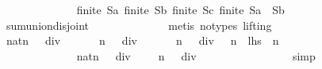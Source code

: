 \begin{isabellebody}
\ \ \ \ \ \ \ \ \ \ \ \ \isamarkupfalse%
\ {\isacharbackquoteopen}finite\ {\isacharquery}Sa{\isacharbackquoteclose}\ {\isacharbackquoteopen}finite\ {\isacharquery}Sb{\isacharbackquoteclose}\ {\isacharbackquoteopen}finite\ {\isacharquery}Sc{\isacharbackquoteclose}\ {\isacharbackquoteopen}finite\ {\isacharparenleft}{\isacharquery}Sa\ {\isasymunion}\ {\isacharquery}Sb{\isacharparenright}{\isacharbackquoteclose}\isanewline
\ \ \ \ \ \ \ \ \ \ \ \ \isamarkupfalse%
\ sum{\isachardot}union{\isacharunderscore}disjoint\isanewline
\ \ \ \ \ \ \ \ \ \ \ \ \isamarkupfalse%
\ {\isacharparenleft}metis\ {\isacharparenleft}no{\isacharunderscore}types{\isacharcomma}\ lifting{\isacharparenright}{\isacharparenright}\isanewline
\isanewline
\ \ \ \ \ \ \ \ \ \ \isamarkupfalse%
\isanewline
\isanewline
\ \ \ \ \ \ \ \ \ \ \isamarkupfalse%
\ {\isachardoublequoteopen}{\isacharparenleft}{\isacharparenleft}{\isacharparenleft}{}{\isacharcolon}{\isacharcolon}nat{\isacharparenright}{\isacharcircum}n\ {\isacharminus}\ {}{\isacharparenright}\ div\ {}\ {\isacharminus}\ {}{\isacharparenright}\ {\isacharplus}\ {}\ {\isacharasterisk}\ {\isacharparenleft}{\isacharparenleft}{}{\isacharcircum}n\ {\isacharminus}\ {}{\isacharparenright}\ div\ {}\ {\isacharminus}\ {}{\isacharparenright}\ {\isacharplus}\ {\isacharparenleft}{}\ {\isacharcircum}\ n\ {\isacharplus}\ {}{\isacharparenright}\ div\ {}\ {\isacharequal}\ {}{\isacharasterisk}{}{\isacharcircum}n{\isachardoublequoteclose}\ {\isacharparenleft}\ {\isachardoublequoteopen}{\isacharquery}lhs\ {\isacharequal}\ {}{\isacharasterisk}{}{\isacharcircum}n{\isachardoublequoteclose}{\isacharparenright}\isanewline
\ \ \ \ \ \ \ \ \ \ \isamarkupfalse%
{\isacharminus}\isanewline
\ \ \ \ \ \ \ \ \ \ \ \ \isamarkupfalse%
\ {\isachardoublequoteopen}{\isacharparenleft}{\isacharparenleft}{}{\isacharcolon}{\isacharcolon}nat{\isacharparenright}{\isacharcircum}n\ {\isacharminus}\ {}{\isacharparenright}\ div\ {}\ {\isacharminus}\ {}\ {\isacharequal}\ {\isacharparenleft}{}{\isacharcircum}n\ {\isacharminus}\ {}{\isacharparenright}\ div\ {}{\isachardoublequoteclose}\isanewline
\ \ \ \ \ \ \ \ \ \ \ \ \ \ \isamarkupfalse%
\ simp\isanewline
\ \ \ \ \ \ \ \ \ \ \ \ \isamarkupfalse%

\end{isabellebody}
